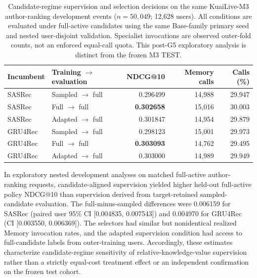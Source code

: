 
\begin{table}[!htbp]
\centering
\caption{Candidate-regime supervision and selection decisions on the same KuaiLive-M3 author-ranking development events ($n=50{,}049$; 12,628 users). All conditions are evaluated under full-active candidates using the same Base-family primary seed and nested user-disjoint validation. Specialist invocations are observed outer-fold counts, not an enforced equal-call quota. This post-G5 exploratory analysis is distinct from the frozen M3 TEST.}
\label{tab:n9-b1-candidate-supervision-draft}
\footnotesize
\setlength{\tabcolsep}{4pt}
\begin{tabular}{@{}llrrr@{}}
\toprule
Incumbent & Training $\rightarrow$ evaluation & NDCG@10 & Memory calls & Calls (\%)\\
\midrule
SASRec & Sampled $\rightarrow$ full & 0.296499 & 14,988 & 29.947\\
SASRec & Full $\rightarrow$ full & \textbf{0.302658} & 15,016 & 30.003\\
SASRec & Adapted $\rightarrow$ full & 0.301847 & 14,954 & 29.879\\
\addlinespace
GRU4Rec & Sampled $\rightarrow$ full & 0.298123 & 15,001 & 29.973\\
GRU4Rec & Full $\rightarrow$ full & \textbf{0.303093} & 14,762 & 29.495\\
GRU4Rec & Adapted $\rightarrow$ full & 0.303000 & 14,989 & 29.949\\
\bottomrule
\end{tabular}
\end{table}

In exploratory nested development analyses on matched full-active author-ranking requests, candidate-aligned supervision yielded higher held-out full-active policy NDCG@10 than supervision derived from target-retained sampled-candidate evaluation. The full-minus-sampled differences were 0.006159 for SASRec (paired user 95\% CI [0.004835, 0.007543]) and 0.004970 for GRU4Rec (CI [0.003550, 0.006369]). The selectors had similar but nonidentical realized Memory invocation rates, and the adapted supervision condition had access to full-candidate labels from outer-training users. Accordingly, these estimates characterize candidate-regime sensitivity of relative-knowledge-value supervision rather than a strictly equal-cost treatment effect or an independent confirmation on the frozen test cohort.

